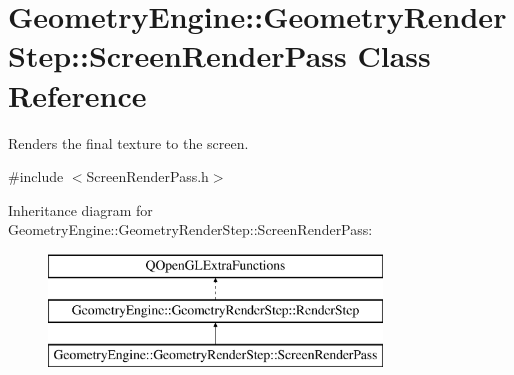 \hypertarget{class_geometry_engine_1_1_geometry_render_step_1_1_screen_render_pass}{}\section{Geometry\+Engine\+::Geometry\+Render\+Step\+::Screen\+Render\+Pass Class Reference}
\label{class_geometry_engine_1_1_geometry_render_step_1_1_screen_render_pass}


Renders the final texture to the screen.  




{\ttfamily \#include $<$Screen\+Render\+Pass.\+h$>$}

Inheritance diagram for Geometry\+Engine\+::Geometry\+Render\+Step\+::Screen\+Render\+Pass\+:\begin{figure}[H]
\begin{center}
\leavevmode
\includegraphics[height=3.000000cm]{class_geometry_engine_1_1_geometry_render_step_1_1_screen_render_pass}
\end{center}
\end{figure}
